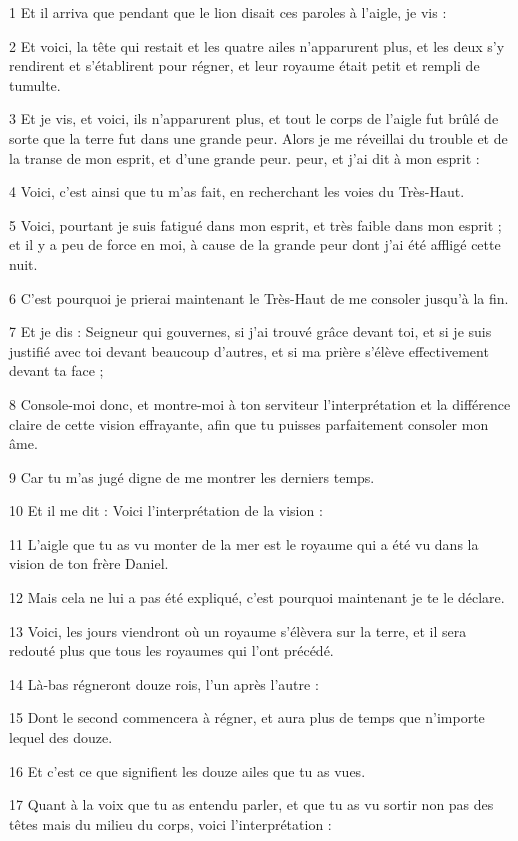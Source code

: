 \par 1 Et il arriva que pendant que le lion disait ces paroles à l'aigle, je vis :
\par 2 Et voici, la tête qui restait et les quatre ailes n'apparurent plus, et les deux s'y rendirent et s'établirent pour régner, et leur royaume était petit et rempli de tumulte.
\par 3 Et je vis, et voici, ils n'apparurent plus, et tout le corps de l'aigle fut brûlé de sorte que la terre fut dans une grande peur. Alors je me réveillai du trouble et de la transe de mon esprit, et d'une grande peur. peur, et j'ai dit à mon esprit :
\par 4 Voici, c'est ainsi que tu m'as fait, en recherchant les voies du Très-Haut.
\par 5 Voici, pourtant je suis fatigué dans mon esprit, et très faible dans mon esprit ; et il y a peu de force en moi, à cause de la grande peur dont j'ai été affligé cette nuit.
\par 6 C'est pourquoi je prierai maintenant le Très-Haut de me consoler jusqu'à la fin.
\par 7 Et je dis : Seigneur qui gouvernes, si j'ai trouvé grâce devant toi, et si je suis justifié avec toi devant beaucoup d'autres, et si ma prière s'élève effectivement devant ta face ;
\par 8 Console-moi donc, et montre-moi à ton serviteur l'interprétation et la différence claire de cette vision effrayante, afin que tu puisses parfaitement consoler mon âme.
\par 9 Car tu m'as jugé digne de me montrer les derniers temps.
\par 10 Et il me dit : Voici l'interprétation de la vision :
\par 11 L'aigle que tu as vu monter de la mer est le royaume qui a été vu dans la vision de ton frère Daniel.
\par 12 Mais cela ne lui a pas été expliqué, c'est pourquoi maintenant je te le déclare.
\par 13 Voici, les jours viendront où un royaume s'élèvera sur la terre, et il sera redouté plus que tous les royaumes qui l'ont précédé.
\par 14 Là-bas régneront douze rois, l'un après l'autre :
\par 15 Dont le second commencera à régner, et aura plus de temps que n'importe lequel des douze.
\par 16 Et c'est ce que signifient les douze ailes que tu as vues.
\par 17 Quant à la voix que tu as entendu parler, et que tu as vu sortir non pas des têtes mais du milieu du corps, voici l'interprétation :
